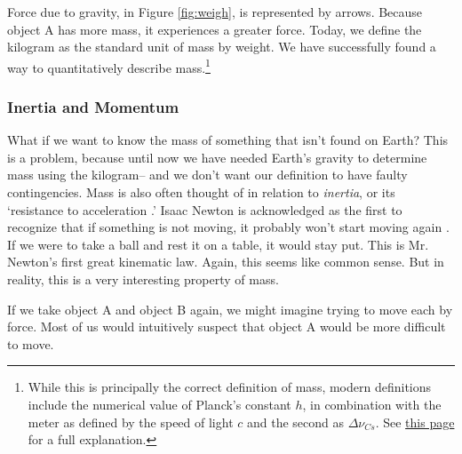 \documentclass{article}
\begin{document}
                Force due to gravity, in Figure \ref{fig:weigh}, is represented by arrows. Because object A has more mass, it experiences a greater force. 
                Today, we define the kilogram as the standard unit of mass by weight. We have successfully found a way to quantitatively describe mass.\footnote{While this is principally the correct definition of mass, modern definitions include the numerical value of Planck's constant $h$, in combination with the meter as defined by the speed of light $c$ and the second as $\Delta \nu_{Cs}$. See \href{https://www.bipm.org/en/si-base-units/kilogram}{this page} for a full explanation.}
            
            \subsubsection{Inertia and Momentum}
                What if we want to know the mass of something that isn't found on Earth? This is a problem, because until now we have needed Earth's gravity to determine mass using the kilogram-- and we don't want our definition to have faulty contingencies. Mass is also often thought of in relation to \textit{inertia}, or its `resistance to acceleration \cite{Bray}.'
                Isaac Newton is acknowledged as the first to recognize that if something is not moving, it probably won't start moving again \cite{Newton}. If we were to take a ball and rest it on a table, it would stay put. This is Mr. Newton's first great kinematic law.
                Again, this seems like common sense. But in reality, this is a very interesting property of mass.
                \par
                If we take object A and object B again, we might imagine trying to move each by force. Most of us would intuitively suspect that object A would be more difficult to move.

                    \begin{figure}[H]
                        \centering
                         \caption{}\label{fig:2}
                    \end{figure}                    
\end{document}

